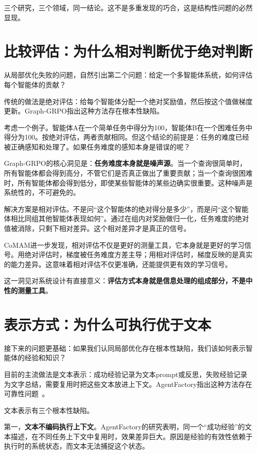 \documentclass[11pt]{article}
\begin{document}
三个研究，三个领域，同一结论。这不是多重发现的巧合，这是结构性问题的必然显现。

\section{比较评估：为什么相对判断优于绝对判断}

从局部优化失败的问题，自然引出第二个问题：给定一个多智能体系统，如何评估每个智能体的贡献？

传统的做法是绝对评估：给每个智能体分配一个绝对奖励值，然后按这个值做梯度更新。Graph-GRPO指出这种方法存在根本性缺陷。

考虑一个例子。智能体A在一个简单任务中得分为100，智能体B在一个困难任务中得分为100。按绝对评估，两者贡献相同。但这个结论的前提是：任务的难度已经被正确感知和处理了。如果任务难度的感知本身是错误的呢？

Graph-GRPO的核心洞见是：\textbf{任务难度本身就是噪声源}。当一个查询很简单时，所有智能体都会得到高分，不管它们是否真正做出了重要贡献；当一个查询很困难时，所有智能体都会得到低分，即使某些智能体的某些边确实很重要。这种噪声是系统性的，不可避免的。

解决方案是相对评估。不是问``这个智能体的绝对得分是多少''，而是问``这个智能体相比同组其他智能体表现如何''。通过在组内对奖励做归一化，任务难度的绝对值被消除，只剩下相对差异。这个相对差异才是真正的信号。

CoMAM进一步发现，相对评估不仅是更好的测量工具，它本身就是更好的学习信号。用绝对评估时，梯度被任务难度方差主导；用相对评估时，梯度反映的是真实的能力差异。这意味着相对评估不仅更准确，还能提供更有效的学习信号。

这一洞见对系统设计有直接意义：\textbf{评估方式本身就是信息处理的组成部分，不是中性的测量工具}。

\section{表示方式：为什么可执行优于文本}

接下来的问题更基础：如果我们认同局部优化存在根本性缺陷，我们该如何表示智能体的经验和知识？

目前的主流做法是文本表示：成功经验记录为文本prompt或反思，失败经验记录为文字总结，需要复用时把这些文本放进上下文。AgentFactory指出这种方法存在可靠性问题~\cite{agentfactory}。

文本表示有三个根本性缺陷。

第一，\textbf{文本不编码执行上下文}。AgentFactory的研究表明，同一个``成功经验''的文本描述，在不同任务上下文中复用时，效果差异巨大。原因是经验的有效性依赖于执行时的系统状态，而文本无法捕捉这个状态。
\end{document}
